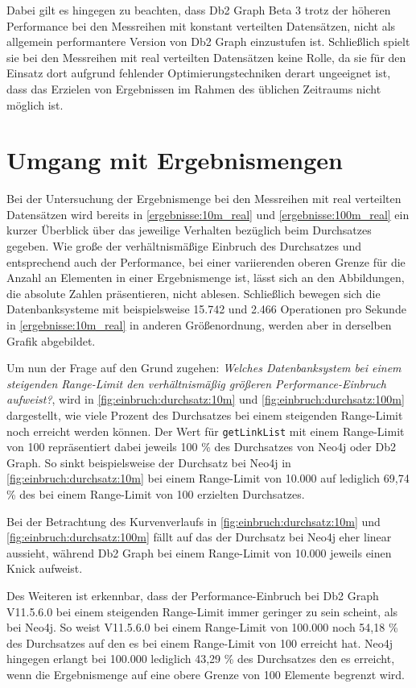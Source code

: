 Dabei gilt es hingegen zu beachten, dass Db2 Graph Beta 3 trotz der höheren Performance bei den Messreihen mit konstant verteilten Datensätzen, nicht als allgemein performantere Version von Db2 Graph einzustufen ist. Schließlich spielt sie bei den Messreihen mit real verteilten Datensätzen keine Rolle, da sie für den Einsatz dort aufgrund fehlender Optimierungstechniken derart ungeeignet ist, dass das Erzielen von Ergebnissen im Rahmen des üblichen Zeitraums nicht möglich ist.

\section{Umgang mit Ergebnismengen}
\label{auswertung:ergebnismenge}
Bei der Untersuchung der Ergebnismenge bei den Messreihen mit real verteilten Datensätzen wird bereits in \autoref{ergebnisse:10m_real} und \autoref{ergebnisse:100m_real} ein kurzer Überblick über das jeweilige Verhalten bezüglich beim Durchsatzes gegeben. Wie große der verhältnismäßige Einbruch des Durchsatzes und entsprechend auch der Performance, bei einer variierenden oberen Grenze für die Anzahl an Elementen in einer Ergebnismenge ist, lässt sich an den Abbildungen, die absolute Zahlen präsentieren, nicht ablesen. Schließlich bewegen sich die Datenbanksysteme mit beispielsweise 15.742 und 2.466 Operationen pro Sekunde in \autoref{ergebnisse:10m_real} in anderen Größenordnung, werden aber in derselben Grafik abgebildet. 

Um nun der Frage auf den Grund zugehen: \textit{Welches Datenbanksystem bei einem steigenden Range-Limit den verhältnismäßig größeren Performance-Einbruch aufweist?}, wird in \autoref{fig:einbruch:durchsatz:10m} und \autoref{fig:einbruch:durchsatz:100m} dargestellt, wie viele Prozent des Durchsatzes bei einem steigenden Range-Limit noch erreicht werden können. Der Wert für \texttt{getLinkList} mit einem Range-Limit von 100 repräsentiert dabei jeweils 100 \% des Durchsatzes von Neo4j oder Db2 Graph. So sinkt beispielsweise der Durchsatz bei Neo4j in \autoref{fig:einbruch:durchsatz:10m} bei einem Range-Limit von 10.000 auf lediglich 69,74 \% des bei einem Range-Limit von 100 erzielten Durchsatzes. 

Bei der Betrachtung des Kurvenverlaufs in \autoref{fig:einbruch:durchsatz:10m} und \autoref{fig:einbruch:durchsatz:100m} fällt auf das der Durchsatz bei Neo4j eher linear aussieht, während Db2 Graph bei einem Range-Limit von 10.000 jeweils einen Knick aufweist. 

Des Weiteren ist erkennbar, dass der Performance-Einbruch bei Db2 Graph V11.5.6.0 bei einem steigenden Range-Limit immer geringer zu sein scheint, als bei Neo4j. So weist V11.5.6.0 bei einem Range-Limit von 100.000 noch 54,18 \% des Durchsatzes auf den es bei einem Range-Limit von 100 erreicht hat. Neo4j hingegen erlangt bei 100.000 lediglich 43,29 \% des Durchsatzes den es erreicht, wenn die Ergebnismenge auf eine obere Grenze von 100 Elemente begrenzt wird. 

